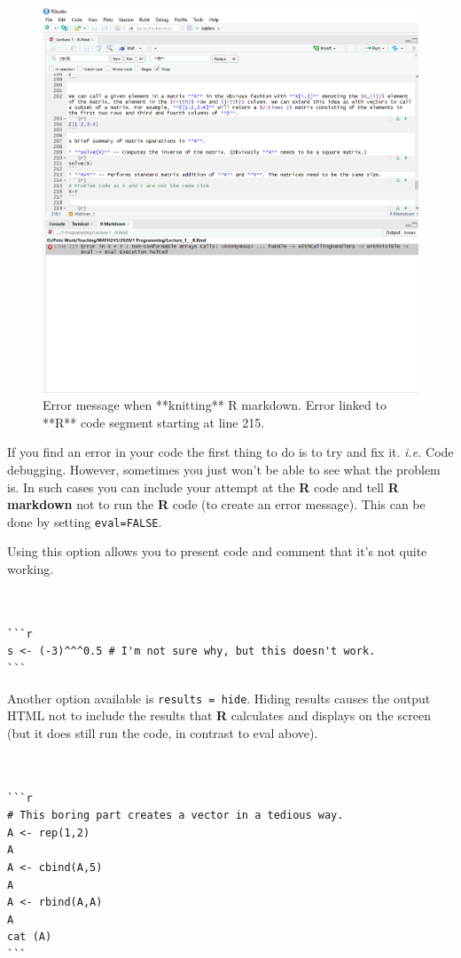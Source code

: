 \documentclass[
]{book}
\begin{document}
\begin{figure}
\includegraphics[width=0.8\linewidth]{Images/Rmarkdown_4} \caption{Error message when **knitting** R markdown. Error linked to **R** code segment starting at line 215.}\label{fig:Rmark4}
\end{figure}

If you find an error in your code the first thing to do is to try and fix it. \emph{i.e.} Code debugging. However, sometimes you just won't be able to see what the problem is. In such cases you can include your attempt at the \textbf{R} code and tell \textbf{R markdown} not to run the \textbf{R} code (to create an error message). This can be done by setting \texttt{eval=FALSE}.

Using this option allows you to present code and comment that it's not quite working.

\begin{verbatim}


```r
s <- (-3)^^^0.5 # I'm not sure why, but this doesn't work.
```
\end{verbatim}

Another option available is \texttt{results\ =\ \textquotesingle{}hide\textquotesingle{}}. Hiding results causes the output HTML not to include the results that \textbf{R} calculates and displays on the screen (but it does still run the code, in contrast to eval above).

\begin{verbatim}


```r
# This boring part creates a vector in a tedious way.
A <- rep(1,2)
A
A <- cbind(A,5)
A
A <- rbind(A,A)
A
cat (A)
```
\end{verbatim}
\end{document}

